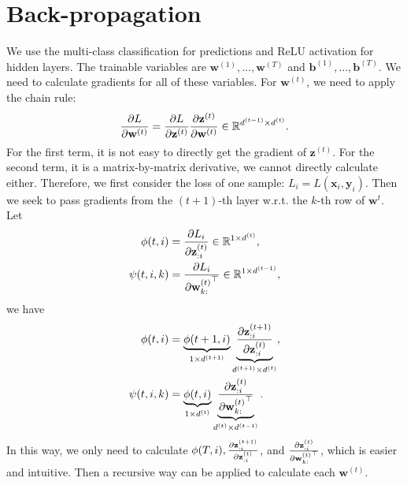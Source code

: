 \documentclass{article}
\begin{document}
\section{Back-propagation}
We use the multi-class classification for predictions and ReLU activation for hidden layers. The trainable variables are $\mathbf{w}^{(1)}, \dots, \mathbf{w}^{(T)}$ and $\mathbf{b}^{(1)}, \dots, \mathbf{b}^{(T)}$. We need to calculate gradients for all of these variables. For $\mathbf{w}^{(t)}$, we need to apply the chain rule:
\begin{align}
    \frac{\partial L}{\partial\mathbf{w}^{(t)}} = \frac{\partial L}{\partial\mathbf{z}^{(t)}}\frac{\partial\mathbf{z}^{(t)}}{\partial\mathbf{w}^{(t)}} \in \mathbb{R}^{d^{(t - 1)} \times d^{(t)}}. \notag
\end{align}
For the first term, it is not easy to directly get the gradient of $\mathbf{z}^{(t)}$. For the second term, it is a matrix-by-matrix derivative, we cannot directly calculate either. Therefore, we first consider the loss of one sample: $L_i = L(\mathbf{x}_i, \mathbf{y}_i)$. Then we seek to pass gradients from the $(t + 1)$-th layer w.r.t. the $k$-th row of $\mathbf{w}^{t}$. Let
\begin{align}
    \phi(t, i) &= \frac{\partial L_{i}}{\partial\mathbf{z}^{(t)}_{:i}} \in \mathbb{R}^{1 \times d^{(t)}}, \notag \\
    \psi(t, i, k) &= \frac{\partial L_{i}}{\partial{\mathbf{w}^{(t)}_{k:}}^\top} \in \mathbb{R}^{1 \times d^{(t - 1)}}, \notag
\end{align}
we have
\begin{align}
    \phi(t, i) &= \underbrace{\phi(t + 1, i)}_{1 \times d^{(t + 1)}} \underbrace{\frac{\partial\mathbf{z}^{(t + 1)}_{:i}}{\partial\mathbf{z}^{(t)}_{:i}}}_{d^{(t + 1)} \times d^{(t)}}, \notag \\
    \psi(t, i, k) &= \underbrace{\phi(t, i)}_{1 \times d^{(t)}}\underbrace{\frac{\partial\mathbf{z}^{(t)}_{:i}}{\partial{\mathbf{w}^{(t)}_{k:}}^\top}}_{d^{(t)} \times d^{(t - 1)}}. \notag
\end{align}
In this way, we only need to calculate $\phi(T, i), \frac{\partial\mathbf{z}^{(t + 1)}_{:i}}{\partial\mathbf{z}^{(t)}_{:i}}$, and $\frac{\partial\mathbf{z}^{(t)}_{:i}}{\partial{\mathbf{w}^{(t)}_{k:}}^\top}$, which is easier and intuitive. Then a recursive way can be applied to calculate each $\mathbf{w}^{(t)}$.
\end{document}

